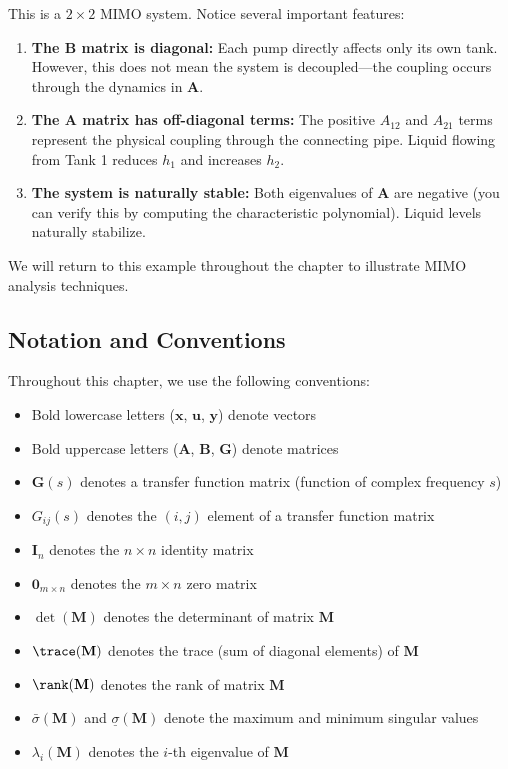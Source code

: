 This is a $2 \times 2$ MIMO system. Notice several important features:

\begin{enumerate}
\item \textbf{The $\mathbf{B}$ matrix is diagonal:} Each pump directly affects only its own tank. However, this does not mean the system is decoupled---the coupling occurs through the dynamics in $\mathbf{A}$.

\item \textbf{The $\mathbf{A}$ matrix has off-diagonal terms:} The positive $A_{12}$ and $A_{21}$ terms represent the physical coupling through the connecting pipe. Liquid flowing from Tank 1 reduces $h_1$ and increases $h_2$.

\item \textbf{The system is naturally stable:} Both eigenvalues of $\mathbf{A}$ are negative (you can verify this by computing the characteristic polynomial). Liquid levels naturally stabilize.
\end{enumerate}

We will return to this example throughout the chapter to illustrate MIMO analysis techniques.

\subsection{Notation and Conventions}

Throughout this chapter, we use the following conventions:

\begin{itemize}
\item Bold lowercase letters ($\mathbf{x}$, $\mathbf{u}$, $\mathbf{y}$) denote vectors
\item Bold uppercase letters ($\mathbf{A}$, $\mathbf{B}$, $\mathbf{G}$) denote matrices
\item $\mathbf{G}(s)$ denotes a transfer function matrix (function of complex frequency $s$)
\item $G_{ij}(s)$ denotes the $(i,j)$ element of a transfer function matrix
\item $\mathbf{I}_n$ denotes the $n \times n$ identity matrix
\item $\mathbf{0}_{m \times n}$ denotes the $m \times n$ zero matrix
\item $\det(\mathbf{M})$ denotes the determinant of matrix $\mathbf{M}$
\item $\trace(\mathbf{M})$ denotes the trace (sum of diagonal elements) of $\mathbf{M}$
\item $\rank(\mathbf{M})$ denotes the rank of matrix $\mathbf{M}$
\item $\bar{\sigma}(\mathbf{M})$ and $\underline{\sigma}(\mathbf{M})$ denote the maximum and minimum singular values
\item $\lambda_i(\mathbf{M})$ denotes the $i$-th eigenvalue of $\mathbf{M}$
\end{itemize}


